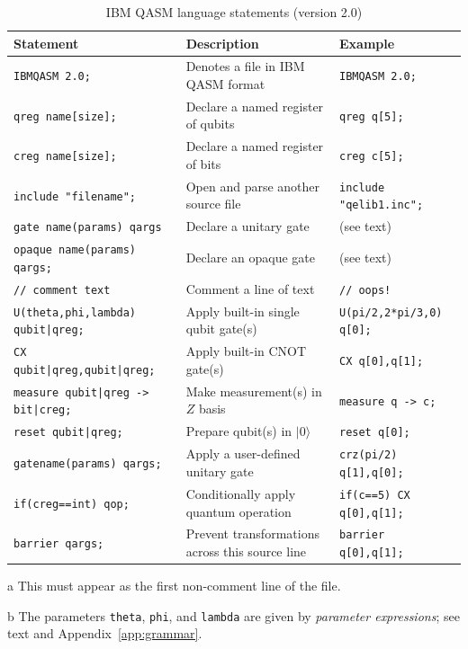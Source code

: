 \documentclass[USenglish,12pt,fleqn]{article} %
\newcommand*{\code}{\texttt}
\begin{document}
\begin{landscape}
\begin{table}[htbp]
\begin{threeparttable}
\caption{IBM QASM language statements (version 2.0)\label{tab:qasm:new}}
\begin{tabular}{@{}lll@{}}
\toprule
Statement & Description & Example \\
\midrule
\code{IBMQASM 2.0;} & Denotes a file in IBM QASM format\tnote{a} & \code{IBMQASM 2.0;}\\
\code{qreg name[size];} & Declare a named register of qubits & \code{qreg q[5];} \\
\code{creg name[size];} & Declare a named register of bits & \code{creg c[5];} \\
\code{include "filename";} & Open and parse another source file & \code{include "qelib1.inc";} \\ 
\code{gate name(params) qargs \string{ body \string}} & Declare a unitary gate &  (see text) \\
\code{opaque name(params) qargs;} & Declare an opaque gate & (see text) \\
\code{// comment text} & Comment a line of text & \code{// oops!} \\
\midrule
\code{U(theta,phi,lambda) qubit|qreg;} & Apply built-in single qubit gate(s)\tnote{b} & \code{U(pi/2,2*pi/3,0) q[0];} \\
\code{CX qubit|qreg,qubit|qreg;} & Apply built-in CNOT gate(s) & \code{CX q[0],q[1];} \\
\code{measure qubit|qreg -> bit|creg;} & Make measurement(s) in $Z$ basis & \code{measure q -> c;} \\
\code{reset qubit|qreg;} & Prepare qubit(s) in $|0\rangle$ & \code{reset q[0];} \\ 
\code{gatename(params) qargs;} & Apply a user-defined unitary gate &  \code{crz(pi/2) q[1],q[0];} \\
\code{if(creg==int) qop;} & Conditionally apply quantum operation & \code{if(c==5) CX q[0],q[1];} \\ 
\midrule
\code{barrier qargs;} & Prevent transformations across this source line & \code{barrier q[0],q[1];} \\
\bottomrule
\end{tabular}
\begin{tablenotes}
\item[a] This must appear as the first non-comment line of the file.
\item[b] The parameters \code{theta}, \code{phi}, and \code{lambda} are given by {\em parameter expressions}; see text and Appendix~\ref{app:grammar}.
\end{tablenotes}
\end{threeparttable}
\end{table}
\end{landscape}
\end{document}
